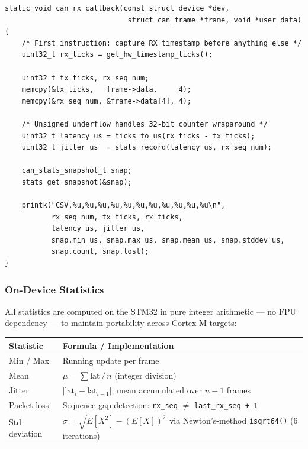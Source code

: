 \documentclass[11pt,a4paper]{article}
\begin{document}
\begin{lstlisting}[style=cstyle, caption={can\_handler.c --- RX ISR callback}]
static void can_rx_callback(const struct device *dev,
                             struct can_frame *frame, void *user_data)
{
    /* First instruction: capture RX timestamp before anything else */
    uint32_t rx_ticks = get_hw_timestamp_ticks();

    uint32_t tx_ticks, rx_seq_num;
    memcpy(&tx_ticks,   frame->data,     4);
    memcpy(&rx_seq_num, &frame->data[4], 4);

    /* Unsigned underflow handles 32-bit counter wraparound */
    uint32_t latency_us = ticks_to_us(rx_ticks - tx_ticks);
    uint32_t jitter_us  = stats_record(latency_us, rx_seq_num);

    can_stats_snapshot_t snap;
    stats_get_snapshot(&snap);

    printk("CSV,%u,%u,%u,%u,%u,%u,%u,%u,%u,%u,%u\n",
           rx_seq_num, tx_ticks, rx_ticks,
           latency_us, jitter_us,
           snap.min_us, snap.max_us, snap.mean_us, snap.stddev_us,
           snap.count, snap.lost);
}
\end{lstlisting}

\subsubsection{On-Device Statistics}

All statistics are computed on the STM32 in pure integer arithmetic --- no FPU dependency ---
to maintain portability across Cortex-M targets:

\begin{center}
\begin{tabular}{ll}
    \toprule
    \textbf{Statistic} & \textbf{Formula / Implementation} \\
    \midrule
    Min / Max    & Running update per frame \\
    Mean         & $\bar{\mu} = \sum \text{lat} \,/\, n$ (integer division) \\
    Jitter       & $|\text{lat}_i - \text{lat}_{i-1}|$; mean accumulated over $n-1$ frames \\
    Packet loss  & Sequence gap detection: \texttt{rx\_seq} $\neq$ \texttt{last\_rx\_seq + 1} \\
    Std deviation & $\sigma = \sqrt{E[X^2] - (E[X])^2}$ via Newton's-method
                   \texttt{isqrt64()} (6 iterations) \\
    \bottomrule
\end{tabular}
\end{center}
\end{document}
